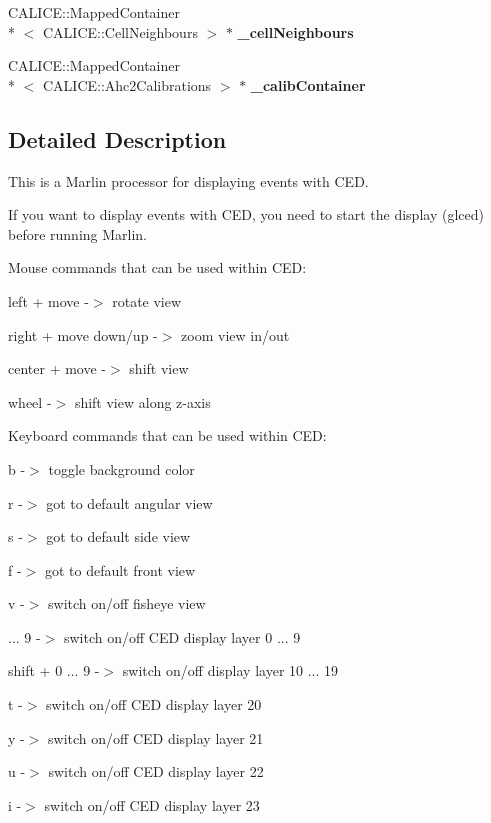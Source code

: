 \begin{DoxyCompactItemize}
\item 
C\-A\-L\-I\-C\-E\-::\-Mapped\-Container\\*
$<$ C\-A\-L\-I\-C\-E\-::\-Cell\-Neighbours $>$ $\ast$ {\bfseries \-\_\-cell\-Neighbours}\label{classCALICE_1_1DEHEventDisplayProcessor_aaeb9c54cefb3a9cdfb34272aecce6112}

\item 
C\-A\-L\-I\-C\-E\-::\-Mapped\-Container\\*
$<$ C\-A\-L\-I\-C\-E\-::\-Ahc2\-Calibrations $>$ $\ast$ {\bf \-\_\-calib\-Container}
\end{DoxyCompactItemize}


\subsection{Detailed Description}
This is a Marlin processor for displaying events with C\-E\-D. 

If you want to display events with C\-E\-D, you need to start the display ({\ttfamily glced}) before running Marlin.

Mouse commands that can be used within C\-E\-D\-:


\begin{DoxyItemize}
\item {\ttfamily  left + move } -\/$>$ rotate view
\item {\ttfamily  right + move down/up } -\/$>$ zoom view in/out
\item {\ttfamily  center + move } -\/$>$ shift view
\item {\ttfamily  wheel } -\/$>$ shift view along z-\/axis
\end{DoxyItemize}

Keyboard commands that can be used within C\-E\-D\-:


\begin{DoxyItemize}
\item {\ttfamily  b } -\/$>$ toggle background color
\item {\ttfamily  r } -\/$>$ got to default angular view
\item {\ttfamily  s } -\/$>$ got to default side view
\item {\ttfamily  f } -\/$>$ got to default front view
\item {\ttfamily  v } -\/$>$ switch on/off fisheye view
\item { ... 9 } -\/$>$ switch on/off C\-E\-D display layer 0 ... 9
\item {\ttfamily  shift + 0 ... 9 } -\/$>$ switch on/off display layer 10 ... 19
\item {\ttfamily  t } -\/$>$ switch on/off C\-E\-D display layer 20
\item {\ttfamily  y } -\/$>$ switch on/off C\-E\-D display layer 21
\item {\ttfamily  u } -\/$>$ switch on/off C\-E\-D display layer 22
\item {\ttfamily  i } -\/$>$ switch on/off C\-E\-D display layer 23
\end{DoxyItemize}

